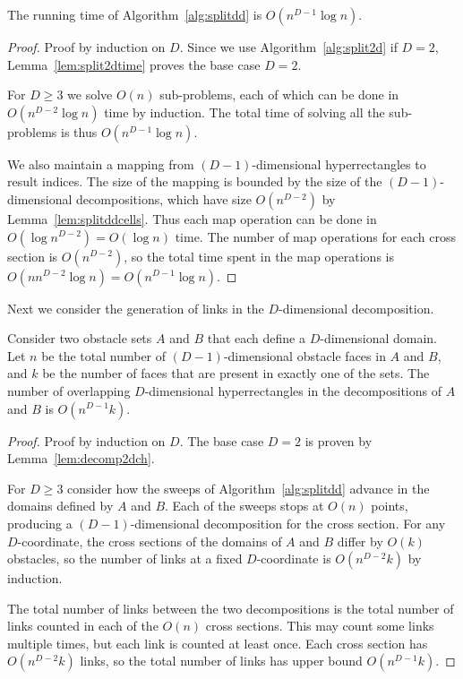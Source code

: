 \documentclass[english,gradu]{tktltiki2018}
\begin{document}
\begin{lem}\label{lem:splitddtime}The running time of Algorithm~\ref{alg:splitdd} is $O(n^{D-1}\log n)$.\end{lem}
\begin{proof}
Proof by induction on $D$.
Since we use Algorithm~\ref{alg:split2d} if $D=2$, Lemma~\ref{lem:split2dtime} proves the base case $D=2$.

For $D\ge 3$  we solve $O(n)$ sub-problems, each of which can be done in $O(n^{D-2}\log n)$ time by induction.
The total time of solving all the sub-problems is thus $O(n^{D-1}\log n)$.

We also maintain a mapping from $(D-1)$-dimensional hyperrectangles to result indices.
The size of the mapping is bounded by the size of the $(D-1)$-dimensional decompositions, which have size $O(n^{D-2})$ by Lemma~\ref{lem:splitddcells}.
Thus each map operation can be done in $O(\log{n^{D-2}})=O(\log n)$ time.
The number of map operations for each cross section is $O(n^{D-2})$, so the total time spent in the map operations is $O(nn^{D-2}\log n)=O(n^{D-1}\log n)$.
\end{proof}

Next we consider the generation of links in the $D$-dimensional decomposition.

\begin{lem}\label{lem:decompddch}
Consider two obstacle sets $A$ and $B$ that each define a $D$-dimensional domain.
Let $n$ be the total number of $(D-1)$-dimensional obstacle faces in $A$ and $B$, and $k$ be the number of faces that are present in exactly one of the sets.
The number of overlapping $D$-dimensional hyperrectangles in the decompositions of $A$ and $B$ is $O(n^{D-1}k)$.
\end{lem}
\begin{proof}
Proof by induction on $D$.
The base case $D=2$ is proven by Lemma~\ref{lem:decomp2dch}.

For $D\ge 3$ consider how the sweeps of Algorithm~\ref{alg:splitdd} advance in the domains defined by $A$ and $B$.
Each of the sweeps stops at $O(n)$ points, producing a $(D-1)$-dimensional decomposition for the cross section.
For any $D$-coordinate, the cross sections of the domains of $A$ and $B$ differ by $O(k)$ obstacles, so the number of links at a fixed $D$-coordinate is $O(n^{D-2}k)$ by induction.

The total number of links between the two decompositions is the total number of links counted in each of the $O(n)$ cross sections.
This may count some links multiple times, but each link is counted at least once.
Each cross section has $O(n^{D-2}k)$ links, so the total number of links has upper bound $O(n^{D-1}k)$.
\end{proof}
\end{document}
